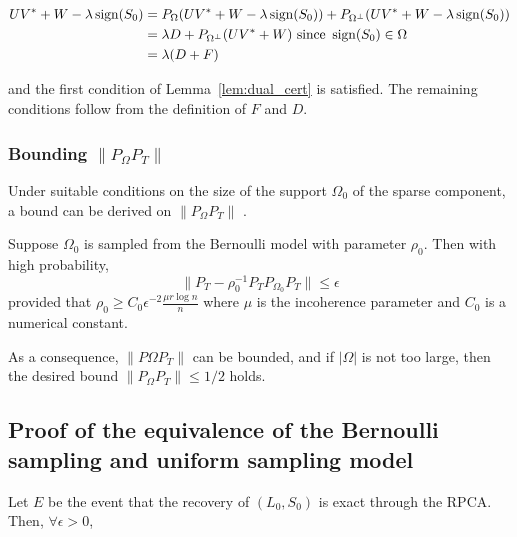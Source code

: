 \documentclass{../common/projectreport}
\begin{document}
\begin{align*}
UV^* + W - \lambda \operatorname{sign}(S_0) 
&= P_\Omega (UV^* + W - \lambda \operatorname{sign}(S_0))+ P_{\Omega^\perp} (UV^* + W - \lambda \operatorname{sign}(S_0)) \\
&= \lambda D+ P_{\Omega^\perp} (UV^* + W) \text{ since } \operatorname{sign}(S_0) \in \Omega\\
&= \lambda (D+F)
\end{align*}

and the first condition of Lemma~\ref{lem:dual_cert} is satisfied. The remaining conditions follow from the definition of $F$ and $D$.

\subsubsection{Bounding $\|P_\Omega P_T\|$}
 Under suitable conditions on the size of the support $\Omega_0$ of the sparse component, a bound can be derived on  $\|P_\Omega P_T\|$ \cite{Candes:2009uq}.
\begin{theorem}
Suppose $\Omega_0$ is sampled from the Bernoulli model with parameter $\rho_0$. Then with high probability,
\[
\|P_T - \rho_0^{-1} P_T P_{\Omega_0} P_T\| \leq \epsilon
\]
provided that $\rho_0 \geq C_0 \epsilon^{-2} \frac{\mu r \log n}{n}$ where $\mu$ is the incoherence parameter and $C_0$ is a numerical constant.
\end{theorem}

As a consequence, $\|P\Omega P_T\|$ can be bounded, and if $|\Omega|$ is not too large, then the desired bound $\|P_\Omega P_T\| \leq 1/2$ holds.




\subsection{Proof of the equivalence of the Bernoulli sampling and uniform sampling model }
\begin{theorem}
Let $E$ be the event that the recovery of $(L_{0},S_{0})$ is exact
through the RPCA. Then, $\forall\epsilon>0$,
\end{theorem}
\end{document}
